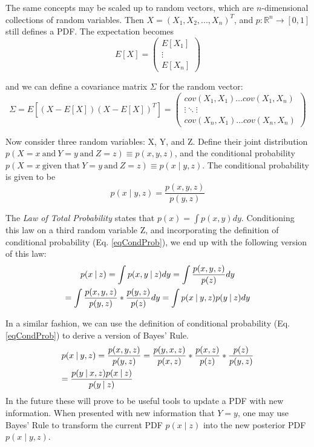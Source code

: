 The same concepts may be scaled up to random vectors, which are \(n\)-dimensional collections of random variables. Then \(X = (X_1,X_2,...,X_n)^T\), and \(p:\mathbb{R}^n \to [0,1]\) still defines a PDF. The expectation becomes \[
E[X] = \begin{pmatrix}
E[X_1] \\
\vdots \\
E[X_n]
\end{pmatrix} 
\]

and we can define a covariance matrix \(\Sigma\) for the random vector:
\[
\Sigma = E[(X - E[X])(X - E[X])^T] = \begin{pmatrix}
cov(X_1,X_1)  \dots cov(X_1,X_n) \\
\vdots \ddots \vdots \\
cov(X_n,X_1)  \dots cov(X_n,X_n)
\end{pmatrix} 
\]


Now consider three random variables: X, Y, and Z. Define their joint distribution \(p(X=x\ \textrm{and}\ Y=y\ \textrm{and}\ Z=z) \equiv p(x,y,z)\), and the conditional probability \(p(X=x\ \textrm{given that}\ Y=y\ \textrm{and}\ Z=z) \equiv p(x \mathbin{\vert} y,z)\). The conditional probability is given to be
\begin{equation} \label{eqCondProb}
p(x \mathbin{\vert} y,z) = \frac{p(x,y,z)}{p(y,z)}
\end{equation}

The \textit{Law of Total Probability} states that \(p(x) = \int p(x,y)dy\). Conditioning this law on a third random variable Z, and incorporating the definition of conditional probability (Eq. \ref{eqCondProb}), we end up with the following version of this law:
\begin{multline} \label{eqTotalProb}
p(x \mathbin{\vert} z) = \int p(x,y \mathbin{\vert} z)dy = \int \frac{p(x,y,z)}{p(z)}dy  \\
= \int \frac{p(x,y,z)}{p(y,z)} * \frac{p(y,z)}{p(z)}dy = \int p(x \mathbin{\vert} y,z) p(y\mathbin{\vert}z)dy \hfill
\end{multline}

In a similar fashion, we can use the definition of conditional probability (Eq. \ref{eqCondProb}) to derive a version of Bayes' Rule. 
\begin{multline} \label{eqBayesThm}
p(x \mathbin{\vert} y,z) = \frac{p(x,y,z)}{p(y,z)} = \frac{p(y,x,z)}{p(x,z)} * \frac{p(x,z)}{p(z)} * \frac{p(z)}{p(y,z)} \\
= \frac{p(y \mathbin{\vert} x,z)p(x\mathbin{\vert}z)}{p(y \mathbin{\vert} z)} \hfill
\end{multline}
In the future these will prove to be useful tools to update a PDF with new information. When presented with new information that  \(Y = y\), one may use Bayes' Rule to transform the current PDF \(p(x \mathbin{\vert}z)\) into the new posterior PDF \(p(x \mathbin{\vert} y,z)\). %

